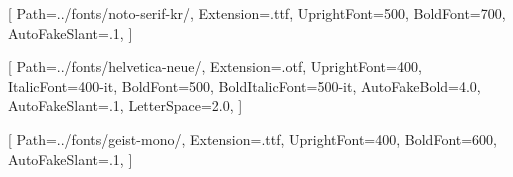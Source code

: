 \usepackage{fontspec}

\setmainfont{noto-serif-kr}[
    Path=../fonts/noto-serif-kr/,
    Extension=.ttf,
    UprightFont=500,
    BoldFont=700,
    AutoFakeSlant=.1,
]

\setsansfont{helvetica-neue}[
    Path=../fonts/helvetica-neue/,
    Extension=.otf,
    UprightFont=400,
    ItalicFont=400-it,
    BoldFont=500,
    BoldItalicFont=500-it,
    AutoFakeBold=4.0,
    AutoFakeSlant=.1,
    LetterSpace=2.0,
]

\setmonofont{geist-mono}[
    Path=../fonts/geist-mono/,
    Extension=.ttf,
    UprightFont=400,
    BoldFont=600,
    AutoFakeSlant=.1,
]
